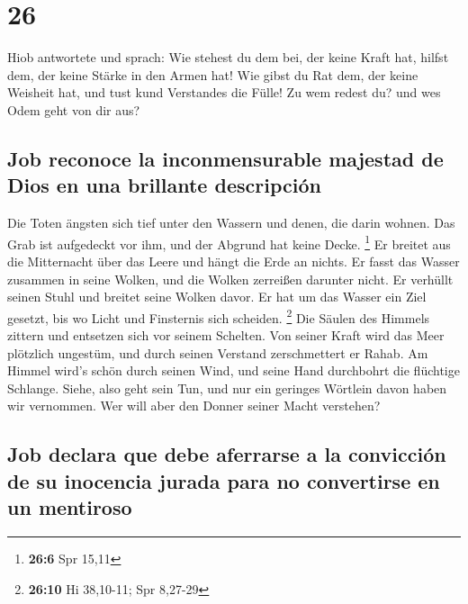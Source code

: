 \hypertarget{section-25}{%
\section{26}\label{section-25}}

 Hiob antwortete und sprach:  Wie stehest du
dem bei, der keine Kraft hat, hilfst dem, der keine Stärke in den Armen
hat!  Wie gibst du Rat dem, der keine Weisheit hat, und
tust kund Verstandes die Fülle!  Zu wem redest du? und wes
Odem geht von dir aus?

\hypertarget{job-reconoce-la-inconmensurable-majestad-de-dios-en-una-brillante-descripciuxf3n}{%
\subsection{Job reconoce la inconmensurable majestad de Dios en una
brillante
descripción}\label{job-reconoce-la-inconmensurable-majestad-de-dios-en-una-brillante-descripciuxf3n}}

 Die Toten ängsten sich tief unter den Wassern und denen,
die darin wohnen.  Das Grab ist aufgedeckt vor ihm, und
der Abgrund hat keine Decke. \footnote{\textbf{26:6} Spr 15,11}
 Er breitet aus die Mitternacht über das Leere und hängt
die Erde an nichts.  Er fasst das Wasser zusammen in seine
Wolken, und die Wolken zerreißen darunter nicht.  Er
verhüllt seinen Stuhl und breitet seine Wolken davor.  Er
hat um das Wasser ein Ziel gesetzt, bis wo Licht und Finsternis sich
scheiden. \footnote{\textbf{26:10} Hi 38,10-11; Spr 8,27-29}
 Die Säulen des Himmels zittern und entsetzen sich vor
seinem Schelten.  Von seiner Kraft wird das Meer
plötzlich ungestüm, und durch seinen Verstand zerschmettert er Rahab.
 Am Himmel wird's schön durch seinen Wind, und seine Hand
durchbohrt die flüchtige Schlange.  Siehe, also geht sein
Tun, und nur ein geringes Wörtlein davon haben wir vernommen. Wer will
aber den Donner seiner Macht verstehen?

\hypertarget{job-declara-que-debe-aferrarse-a-la-convicciuxf3n-de-su-inocencia-jurada-para-no-convertirse-en-un-mentiroso}{%
\subsection{Job declara que debe aferrarse a la convicción de su
inocencia jurada para no convertirse en un
mentiroso}\label{job-declara-que-debe-aferrarse-a-la-convicciuxf3n-de-su-inocencia-jurada-para-no-convertirse-en-un-mentiroso}}

